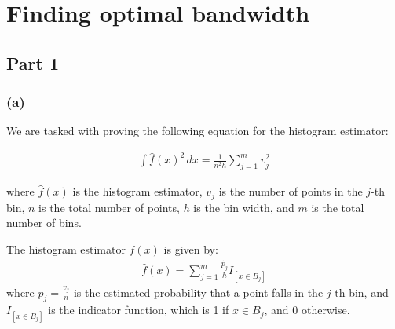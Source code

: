 \section{Finding optimal bandwidth}

\subsection{Part 1}
\subsubsection{(a)}
We are tasked with proving the following equation for the histogram estimator:

\begin{align}
	\int \hat{f}(x)^2 \, dx = \frac{1}{n^2 h} \sum_{j=1}^{m} v_j^2
\end{align}

where \( \hat{f}(x) \) is the histogram estimator, \( v_j \) is the number of
points in the \( j \)-th bin, \( n \) is the total number of points, \( h \) is
the bin width, and \( m \) is the total number of bins.

The histogram estimator \( \hat{f}(x) \) is given by:
\begin{align}
	\hat{f}(x) = \sum_{j=1}^{m} \frac{\hat{p}_j}{h} I_{[x \in B_j]}
\end{align}
where $\hat{p}_j = \frac{v_j}{n}$ is the estimated probability that a point
falls in the $j$-th bin, and $I_{[x \in B_j]}$ is the indicator
function, which is 1 if $x \in B_j$, and 0 otherwise.

